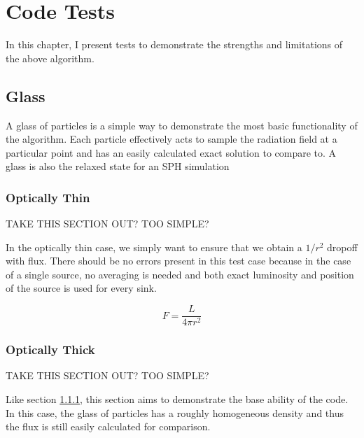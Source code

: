\pagestyle{fancy}
\headheight 20pt
\chead{}
\lfoot{}
\cfoot{\thepage}
\rfoot{}
\renewcommand{\headrulewidth}{0.1pt}
\renewcommand{\footrulewidth}{0.1pt}


\chapter{Code Tests}
\label{chap:codetests}
\thispagestyle{fancy}

In this chapter, I present tests to demonstrate the strengths and limitations of the above algorithm.

\section{Glass}
\label{sec:glass}

A glass of particles is a simple way to demonstrate the most basic functionality of the algorithm. Each particle effectively acts to sample the radiation field at a particular point and has an easily calculated exact solution to compare to. A glass is also the relaxed state for an SPH simulation

\subsection{Optically Thin}
\label{sec:thinglass}

{TAKE THIS SECTION OUT? TOO SIMPLE?}

In the optically thin case, we simply want to ensure that we obtain a $1/r^2$ dropoff with flux. There should be no errors present in this test case because in the case of a single source, no averaging is needed and both exact luminosity and position of the source is used for every sink.

\begin{equation}
\label{eq:flux}
F = \frac{L}{4\pi r^2}
\end{equation}

\subsection{Optically Thick}
\label{sec:thickglass}

{TAKE THIS SECTION OUT? TOO SIMPLE?}

Like section \ref{sec:thinglass}, this section aims to demonstrate the base ability of the code. In this case, the glass of particles has a roughly homogeneous density and thus the flux is still easily calculated for comparison.

